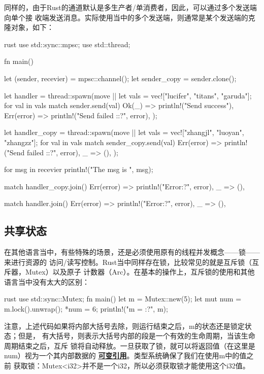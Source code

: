 同样的，由于Rust的通道默认是多生产者/单消费者，因此，可以通过多个发送端向单个接
收端发送消息。实际使用当中的多个发送端，则通常是某个发送端的克隆对象，如下：
\begin{code-block}{rust}
use std::sync::mpsc;
use std::thread;

fn main() {
    let (sender, recevier) = mpsc::channel();
    let sender_copy = sender.clone();

    let handler = thread::spawn(move || {
        let vals = vec!["lucifer", "titans", "garuda"];
        for val in vals {
            match sender.send(val) {
                Ok(_) => println!("Send success"),
                Err(error) => println!("Send failed :{:?}", error),
            }
        }
    });

    let handler_copy = thread::spawn(move || {
        let vals = vec!["zhangjl", "luoyan", "zhangzz"];
        for val in vals {
            match sender_copy.send(val) {
                Err(error) => println!("Send failed :{:?}", error),
                _ => (),
            }
        }
    });

    for msg in recevier {
        println!("The msg is {}", msg);
    }

    match handler_copy.join() {
        Err(error) => println!("Error{:?}", error),
        _ => (),
    }

    match handler.join() {
        Err(error) => println!("Error{:?}", error),
        _ => (),
    }
}
\end{code-block}

\subsection{共享状态}
在其他语言当中，有些特殊的场景，还是必须使用原有的线程并发概念——锁——来进行资源的
访问/读写控制。Rust当中同样存在锁，比较常见的就是互斥锁（互斥器，Mutex）以及原子
计数器（Arc）。在基本的操作上，互斥锁的使用和其他语言当中没有太大的区别：
\begin{code-block}{rust}
use std::sync::Mutex;
fn main() {
    let m = Mutex::new(5);
    {
        let mut num = m.lock().unwrap();
        *num = 6;
    }
    println!("m = {:?}", m);
}
\end{code-block}
注意，上述代码如果将内部大括号去除，则运行结束之后，m的状态还是锁定状态；但是，
有大括号，则表示大括号内部的段是一个有效的生命周期，当该生命周期结束之后，互斥
锁将自动释放。一旦获取了锁，就可以将返回值（在这里是num）视为一个其内部数据的
\underline{\color{red} \textbf{可变引用}}。类型系统确保了我们在使用m中的值之前
获取锁：Mutex<i32>并不是一个i32，所以必须获取锁才能使用这个i32值。

